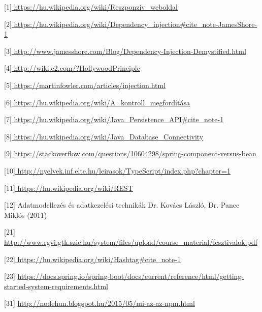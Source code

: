 \begin{thebibliography}{x}




[1]\url{ https://hu.wikipedia.org/wiki/Reszponzív\_weboldal }

[2]\url{ https://hu.wikipedia.org/wiki/Dependency\_injection#cite_note-JamesShore-1 }	

[3]\url{ http://www.jamesshore.com/Blog/Dependency-Injection-Demystified.html }

[4]\url{ http://wiki.c2.com/?HollywoodPrinciple }

[5]\url{ https://martinfowler.com/articles/injection.html }

[6]\url{ https://hu.wikipedia.org/wiki/A_kontroll_megfordítása }

[7]\url{ https://hu.wikipedia.org/wiki/Java_Persistence_API#cite_note-1 }

[8]\url{ https://hu.wikipedia.org/wiki/Java_Database_Connectivity }

[9]\url{ https://stackoverflow.com/questions/10604298/spring-component-versus-bean }

[10]\url{ http://nyelvek.inf.elte.hu/leirasok/TypeScript/index.php?chapter=1 }

[11]\url{ https://hu.wikipedia.org/wiki/REST }

[12] Adatmodellezés és adatkezelési technikák
Dr. Kovács László, Dr. Pance Miklós (2011)

[21]\url{ http://www.rgvi.gtk.szie.hu/system/files/upload/course_material/fesztivalok.pdf }

[22]\url{ https://hu.wikipedia.org/wiki/Hashtag#cite_note-1 }

[23] \url{ https://docs.spring.io/spring-boot/docs/current/reference/html/getting-started-system-requirements.html }

[31] \url{ http://nodehun.blogspot.hu/2015/05/mi-az-az-npm.html }

\end{thebibliography}
